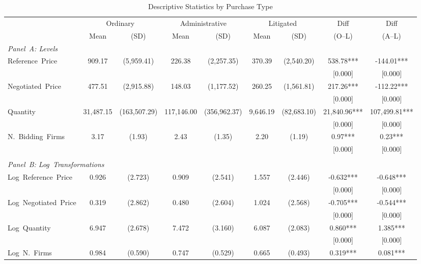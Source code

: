 \begin{table}[ht]
  \centering
  \caption{Descriptive Statistics by Purchase Type}
  \label{tab:desc_stats}
  \small
  \begin{threeparttable}
  \begin{tabular}{lcccccccc}
    \hline\hline
    & \multicolumn{2}{c}{Ordinary} & \multicolumn{2}{c}{Administrative} & \multicolumn{2}{c}{Litigated} & Diff & Diff \\
    \cmidrule(lr){2-3} \cmidrule(lr){4-5} \cmidrule(lr){6-7}
    & Mean & (SD) & Mean & (SD) & Mean & (SD) & (O--L) & (A--L) \\
    \hline
    \multicolumn{9}{l}{\textit{Panel~A: Levels}} \\[3pt]
    Reference~Price & 909.17 & (5,959.41) & 226.38 & (2,257.35) & 370.39 & (2,540.20) & 538.78*** & -144.01*** \\
     & & & & & & & [0.000] & [0.000] \\
    Negotiated~Price & 477.51 & (2,915.88) & 148.03 & (1,177.52) & 260.25 & (1,561.81) & 217.26*** & -112.22*** \\
     & & & & & & & [0.000] & [0.000] \\
    Quantity & 31,487.15 & (163,507.29) & 117,146.00 & (356,962.37) & 9,646.19 & (82,683.10) & 21,840.96*** & 107,499.81*** \\
     & & & & & & & [0.000] & [0.000] \\
    N.~Bidding~Firms & 3.17 & (1.93) & 2.43 & (1.35) & 2.20 & (1.19) & 0.97*** & 0.23*** \\
     & & & & & & & [0.000] & [0.000] \\
    \\[3pt]
    \multicolumn{9}{l}{\textit{Panel~B: Log~Transformations}} \\[3pt]
    Log~Reference~Price & 0.926 & (2.723) & 0.909 & (2.541) & 1.557 & (2.446) & -0.632*** & -0.648*** \\
     & & & & & & & [0.000] & [0.000] \\
    Log~Negotiated~Price & 0.319 & (2.862) & 0.480 & (2.604) & 1.024 & (2.568) & -0.705*** & -0.544*** \\
     & & & & & & & [0.000] & [0.000] \\
    Log~Quantity & 6.947 & (2.678) & 7.472 & (3.160) & 6.087 & (2.083) & 0.860*** & 1.385*** \\
     & & & & & & & [0.000] & [0.000] \\
    Log~N.~Firms & 0.984 & (0.590) & 0.747 & (0.529) & 0.665 & (0.493) & 0.319*** & 0.081*** \\

\end{tabular}
\end{threeparttable}
\end{table}
